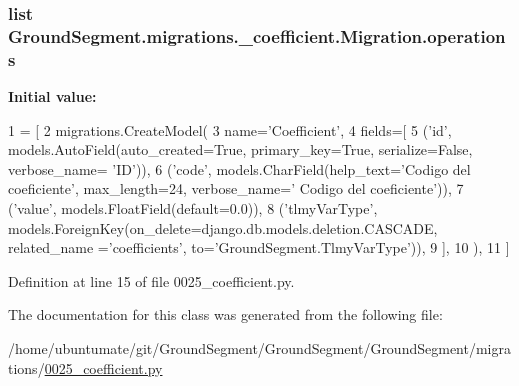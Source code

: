 \hypertarget{class_ground_segment_1_1migrations_1_10025__coefficient_1_1_migration_adc3ba9fae9d0b0167764a03d71bffe40}{}
\subsubsection[{operations}]{\setlength{\rightskip}{0pt plus 5cm}list Ground\+Segment.\+migrations.\+\_\+coefficient.\+Migration.\+operations\hspace{0.3cm}{\ttfamily [static]}}\label{class_ground_segment_1_1migrations_1_10025__coefficient_1_1_migration_adc3ba9fae9d0b0167764a03d71bffe40}
{\bfseries Initial value\+:}
\begin{DoxyCode}
1 = [
2         migrations.CreateModel(
3             name=\textcolor{stringliteral}{'Coefficient'},
4             fields=[
5                 (\textcolor{stringliteral}{'id'}, models.AutoField(auto\_created=\textcolor{keyword}{True}, primary\_key=\textcolor{keyword}{True}, serialize=\textcolor{keyword}{False}, verbose\_name=\textcolor{stringliteral}{
      'ID'})),
6                 (\textcolor{stringliteral}{'code'}, models.CharField(help\_text=\textcolor{stringliteral}{'Codigo del coeficiente'}, max\_length=24, verbose\_name=\textcolor{stringliteral}{'
      Codigo del coeficiente'})),
7                 (\textcolor{stringliteral}{'value'}, models.FloatField(default=0.0)),
8                 (\textcolor{stringliteral}{'tlmyVarType'}, models.ForeignKey(on\_delete=django.db.models.deletion.CASCADE, related\_name
      =\textcolor{stringliteral}{'coefficients'}, to=\textcolor{stringliteral}{'GroundSegment.TlmyVarType'})),
9             ],
10         ),
11     ]
\end{DoxyCode}


Definition at line 15 of file 0025\+\_\+coefficient.\+py.



The documentation for this class was generated from the following file\+:\begin{DoxyCompactItemize}
\item 
/home/ubuntumate/git/\+Ground\+Segment/\+Ground\+Segment/\+Ground\+Segment/migrations/\hyperlink{0025__coefficient_8py}{0025\+\_\+coefficient.\+py}\end{DoxyCompactItemize}
